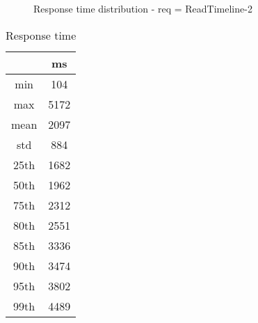 \begin{minipage}{0.75\linewidth}
\begin{figure}[h]
\begin{adjustbox}{max width=1.0\linewidth, keepaspectratio}
  \end{adjustbox}
  \caption{Response time distribution - req = ReadTimeline-2}
\end{figure}
\end{minipage}\hfill\begin{minipage}{0.18\linewidth}
\begin{table}[h]
\begin{tabular}{|cc|}
\hline
\textbf{} & \textbf{ms}\\ \hline
 \Xhline{0.005\arrayrulewidth}
min & 104\\
 \Xhline{0.005\arrayrulewidth}
max & 5172\\
 \Xhline{0.005\arrayrulewidth}
mean & 2097\\
 \Xhline{0.005\arrayrulewidth}
std & 884\\
\hline
\hline
 \Xhline{0.005\arrayrulewidth}
25th & 1682\\
 \Xhline{0.005\arrayrulewidth}
50th & 1962\\
 \Xhline{0.005\arrayrulewidth}
75th & 2312\\
 \Xhline{0.005\arrayrulewidth}
80th & 2551\\
 \Xhline{0.005\arrayrulewidth}
85th & 3336\\
 \Xhline{0.005\arrayrulewidth}
90th & 3474\\
 \Xhline{0.005\arrayrulewidth}
95th & 3802\\
 \Xhline{0.005\arrayrulewidth}
99th & 4489\\
\hline
\end{tabular}
\caption{Response time}
\end{table}
\end{minipage}\hfill